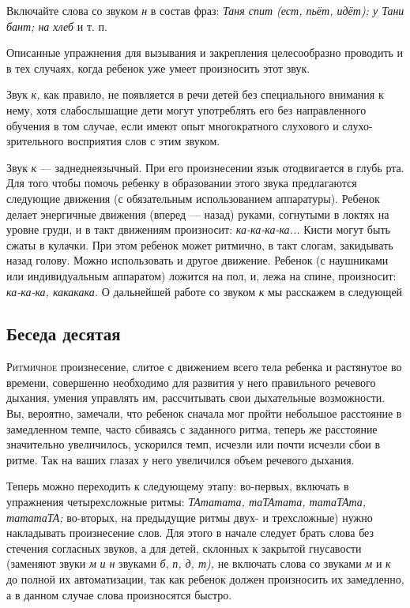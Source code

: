 \documentclass[a5paper]{book}
\renewcommand{\emph}[1]{\textit{#1}}
\begin{document}
Включайте слова со звуком \emph{н} в состав фраз: \emph{Таня спит (ест,
пьёт, идёт); у Тани бант; на хлеб} и т. п.

Описанные упражнения для вызывания и закрепления целесообразно проводить
и в тех случаях, когда ребенок уже умеет произносить этот звук.

Звук \emph{к,} как правило, не появляется в речи детей без специального
внимания к нему, хотя слабослышащие дети могут употреблять его без
направленного обучения в том случае, если имеют опыт многократного
слухового и слухо-зрительного восприятия слов с этим звуком.

Звук \emph{к} --- заднеднеязычный. При его произнесении язык
отодвигается в глубь рта. Для того чтобы помочь ребенку в образовании
этого звука предлагаются следующие движения (с обязательным
использованием аппаратуры). Ребенок делает энергичные движения (вперед
--- назад) руками, согнутыми в локтях на уровне груди, и в такт
движениям произносит: \emph{ка-ка-ка-ка...} Кисти могут быть сжаты в
кулачки. При этом ребенок может ритмично, в такт слогам, закидывать
назад голову. Можно использовать и другое движение. Ребенок (с
наушниками или индивидуальным аппаратом) ложится на пол, и, лежа на
спине, произносит: \emph{ка-ка-ка, какакака.} О дальнейшей работе со
звуком \emph{к} мы расскажем в следующей

\subsection*{Беседа десятая}

\textsc{Ритмичное} произнесение, слитое с движением всего тела ребенка и
растянутое во времени, совершенно необходимо для развития у него
правильного речевого дыхания, умения управлять им, рассчитывать свои
дыхательные возможности. Вы, вероятно, замечали, что ребенок сначала мог
пройти небольшое расстояние в замедленном темпе, часто сбиваясь с
заданного ритма, теперь же расстояние значительно увеличилось, ускорился
темп, исчезли или почти исчезли сбои в ритме. Так на ваших глазах у него
увеличился объем речевого дыхания.

Теперь можно переходить к следующему этапу: во-первых, включать в
упражнения четырехсложные ритмы: \emph{ТАтатата, таТАтата, татаТАта,
тататаТА;} во-вторых, на предыдущие ритмы двух- и трехсложные) нужно
накладывать произнесение слов. Для этого в начале следует брать слова
без стечения согласных звуков, а для детей, склонных к закрытой
гнусавости (заменяют звуки \emph{м} \emph{и н} звуками \emph{б},
\emph{п, д, т),} не включать слова со звуками \emph{м} и \emph{к} до
полной их автоматизации, так как ребенок должен произносить их
замедленно, а в данном случае слова произносятся быстро.
\end{document}

